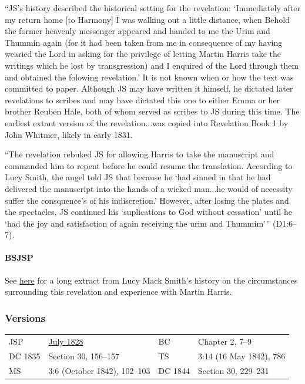 			``JS's history described the historical setting for the revelation: `Immediately after my return home [to Harmony] I was walking out a little distance, when Behold the former heavenly messenger appeared and handed to me the Urim and Thummin again (for it had been taken from me in consequence of my having wearied the Lord in asking for the privilege of letting Martin Harris take the writings which he lost by transgression) and I enquired of the Lord through them and obtained the folowing revelation.' It is not known when or how the text was committed to paper. Although JS may have written it himself, he dictated later revelations to scribes and may have dictated this one to either Emma or her brother Reuben Hale, both of whom served as scribes to JS during this time. The earliest extant version of the revelation...was copied into Revelation Book 1 by John Whitmer, likely in early 1831.
			
			``The revelation rebuked JS for allowing Harris to take the manuscript and commanded him to repent before he could resume the translation. According to Lucy Smith, the angel told JS that because he `had sinned in that he had delivered the manuscript into the hands of a wicked man...he would of necessity suffer the consquence's of his indiscretion.' However, after losing the plates and the spectacles, JS continued his `suplications to God without cessation' until he `had the joy and satisfaction of again receiving the urim and Thummim''' (D1:6--7).
			
		\paragraph{BSJSP}
		
			See \hyperref[EXSS-DC3-BACKGROUND]{here} for a long extract from Lucy Mack Smith's history on the circumstances surrounding this revelation and experience with Martin Harris.
		
	\subsubsection{Versions}
		\label{DC3-V}
	
		\begin{tabular}{p{1in}p{2in}p{1in}p{2in}}
			JSP 	& \hyperref[EMS-1828-1829-JS-JUL-1828]{July 1828}	& BC		& Chapter 2, 7--9 \\
			DC 1835 & Section 30, 156--157								& TS		& 3:14 (16 May 1842), 786 \\
			MS		& 3:6 (October 1842), 102--103						& DC 1844	& Section 30, 229--231 \\
		\end{tabular}
		
